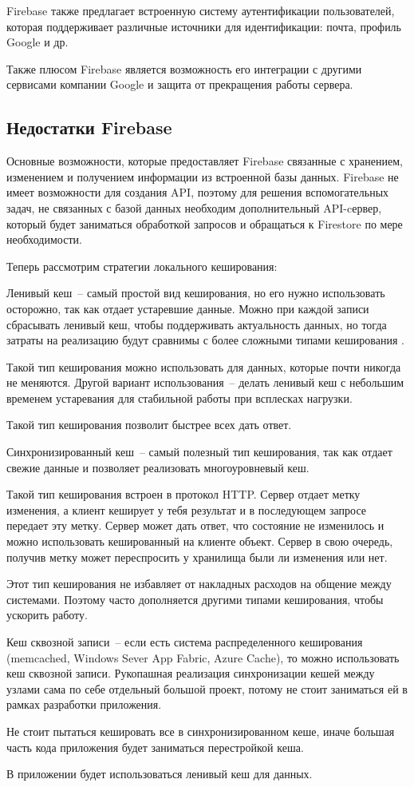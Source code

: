 Firebase также предлагает встроенную систему аутентификации пользователей, которая поддерживает различные источники для идентификации: почта, профиль Google и др.

Также плюсом Firebase является возможность его интеграции с другими сервисами компании Google и защита от прекращения работы сервера.

\subsection{Недостатки Firebase}
Основные возможности, которые предоставляет Firebase связанные с хранением, изменением и получением информации из встроенной базы данных. Firebase не имеет возможности для создания API, поэтому для решения вспомогательных задач, не связанных с базой данных необходим дополнительный API-cервер, который будет заниматься обработкой запросов и обращаться к Firestore по мере необходимости.

Теперь рассмотрим стратегии локального кеширования:

Ленивый кеш~-- самый простой вид кеширования, но его нужно использовать осторожно, так как отдает устаревшие данные. Можно при каждой записи сбрасывать ленивый кеш, чтобы поддерживать актуальность данных, но тогда затраты на реализацию будут сравнимы с более сложными типами кеширования \cite{web15}.

Такой тип кеширования можно использовать для данных, которые почти никогда не меняются. Другой вариант использования~-- делать ленивый кеш с небольшим временем устаревания для стабильной работы при всплесках нагрузки.

Такой тип кеширования позволит быстрее всех дать ответ.

Синхронизированный кеш~-- самый полезный тип кеширования, так как отдает свежие данные и позволяет реализовать многоуровневый кеш.

Такой тип кеширования встроен в протокол HTTP. Сервер отдает метку изменения, а клиент кеширует у тебя результат и в последующем запросе передает эту метку. Сервер может дать ответ, что состояние не изменилось и можно использовать кешированный на клиенте объект. Сервер в свою очередь, получив метку может переспросить у хранилища были ли изменения или нет.

Этот тип кеширования не избавляет от накладных расходов на общение между системами. Поэтому часто дополняется другими типами кеширования, чтобы ускорить работу.

Кеш сквозной записи~-- если есть система распределенного кеширования (memcached, Windows Sever App Fabric, Azure Cache), то можно использовать кеш сквозной записи. Рукопашная реализация синхронизации кешей между узлами сама по себе отдельный большой проект, потому не стоит заниматься ей в рамках разработки приложения.

Не стоит пытаться кешировать все в синхронизированном кеше, иначе большая часть кода приложения будет заниматься перестройкой кеша.

В приложении будет использоваться ленивый кеш для данных.